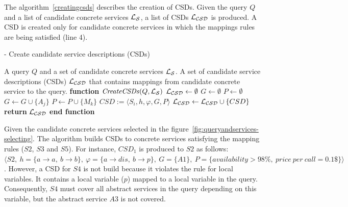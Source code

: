 The algorithm~\ref{creatingcsds} describes the creation of CSDs. Given the query $Q$ and a list of candidate concrete services $\hbox{${\cal L_{S}}$}$, a list of CSDs $\hbox{${\cal L_{CSD}}$}$ is produced. A  CSD is created only for candidate concrete services in which the mappings rules are being satisfied (line 4).
%

\begin{algorithm}[h!]
\caption{ - Create candidate service descriptions (CSDs)}
\label{creatingcsds}
\begin{algorithmic}[1]
\REQUIRE A query $Q$ and a set of candidate concrete services $\hbox{${\cal L_{S}}$}$.
\ENSURE A set of candidate service descriptions (CSDs) $\hbox{${\cal L_{CSD}}$}$ that contains mappings from candidate concrete service to the query.
\STATE \textbf{function} $\mathit{CreateCSDs} (Q, \hbox{${\cal L_{S}}$})$
\STATE $\hbox{${\cal L_{CSD}}$} \leftarrow \emptyset$
		\STATE $G \leftarrow \emptyset$	
		\STATE $P \leftarrow \emptyset$		
			\STATE $G \leftarrow G \cup \lbrace A_{j} \rbrace$ 
		\ENDFOR
			\STATE $P \leftarrow P \cup \lbrace M_{k} \rbrace$ 
		\ENDFOR
		\STATE $CSD := \langle S_{i}, h, \varphi, G, P \rangle$	
		\STATE $\hbox{${\cal L_{CSD}}$} \leftarrow \hbox{${\cal L_{CSD}}$} \cup \lbrace CSD \rbrace$	
	\ENDIF
\ENDFOR
\STATE \textbf{return} $\hbox{${\cal L_{CSD}}$}$
\STATE \textbf{end function}
\end{algorithmic}
\end{algorithm}

Given the candidate concrete services selected in the figure~\ref{fig:queryandservices-selecting}. The algorithm builds CSDs to concrete services satisfying the mapping rules ($S2$, $S3$ and $S5$). For instance, $CSD_{1}$ is produced to $S2$ as follows: 
$\langle S2, \ h = \lbrace a \rightarrow a, \ b \rightarrow b \rbrace, \ \varphi = \lbrace a \rightarrow dis, \ b \rightarrow p \rbrace, \ G = \lbrace A1 \rbrace, \ P = \lbrace availability > 98\%, \ price \ per \ call = 0.1\$ \rbrace \rangle$. However, a CSD for $S4$ is not build because it violates the rule for local variables. It contains a local variable ($p$) mapped to a local variable in the query. Consequently, $S4$ must cover all abstract services in the query depending on this variable, but the abstract service $A3$ is not covered.


